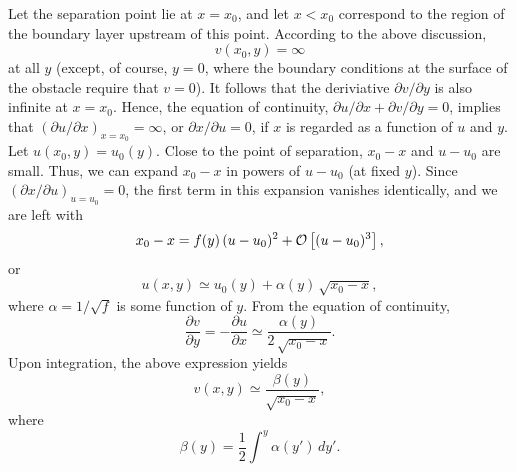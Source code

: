 Let the separation point lie at $x=x_0$, and let $x<x_0$ correspond to the region of the boundary layer upstream
of this point. According to the above discussion,
\begin{equation}
v(x_0,y) = \infty
\end{equation}
at all $y$ (except, of course,  $y=0$, where the boundary conditions at the surface of the obstacle require that $v=0$).
It follows that  the deriviative $\partial v/\partial y$ is also infinite at $x=x_0$.  Hence, the
equation of continuity, $\partial u/\partial x+\partial v/\partial y=0$, implies that $(\partial u/\partial x)_{x=x_0}=\infty$,
or $\partial x/\partial u=0$, if $x$ is regarded as a function of $u$ and $y$. Let $u(x_0,y)=u_0(y)$. 
Close to the point of separation, $x_0-x$ and $u-u_0$ are small. Thus, we can expand $x_0-x$ in powers
of $u-u_0$ (at fixed $y$). Since $(\partial x/\partial u)_{u=u_0}=0$, the first term in this expansion
vanishes identically, and we are left with
\begin{equation}
x_0-x = f(y)\,(u-u_0)^2 + {\cal O}\left[(u-u_0)^3\right],
\end{equation}
or
\begin{equation}\label{ej6.123}
u(x,y)\simeq u_0(y) +\alpha(y)\,\sqrt{x_0-x},
\end{equation}
where $\alpha=1/\sqrt{f}$ is some function of $y$. From the equation of continuity,
\begin{equation}
\frac{\partial v}{\partial y} = -\frac{\partial u}{\partial x} \simeq \frac{\alpha(y)}{2\,\sqrt{x_0-x}}.
\end{equation}
Upon integration, the above expression yields
\begin{equation}\label{ej6.125}
v(x,y) \simeq \frac{\beta(y)}{\sqrt{x_0-x}},
\end{equation}
where 
\begin{equation}\label{ej6.126}
\beta(y) = \frac{1}{2}\int^y \alpha(y')\,dy'.
\end{equation}

